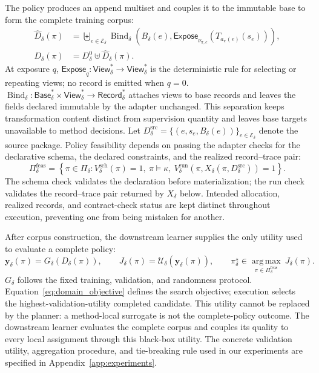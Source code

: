 The policy produces an append multiset and couples it to the immutable base to form the complete training corpus:
\begin{equation}
 \begin{aligned}
 \widehat D_{\delta}(\pi)
 &=\biguplus_{e\in\mathcal{E}_{\delta}}
 \operatorname{Bind}_{\delta}\!\left(
 B_{\delta}(e),
 \mathsf{Expose}_{\nu_{\pi,e}}\!
 \left(T_{a_{\pi}(e)}(s_e)\right)\right),\\
 D_{\delta}(\pi)
 &=D^0_{\delta}\mathbin{\uplus}\widehat D_{\delta}(\pi).
 \end{aligned}
 \label{eq:induced_corpus}
\end{equation}
At exposure $q$, $\mathsf{Expose}_{q}:\mathsf{View}_{\delta}^{*}\to\mathsf{View}_{\delta}^{*}$ is the deterministic rule for selecting or repeating views; no record is emitted when $q=0$.
$\operatorname{Bind}_{\delta}:\mathsf{Base}_{\delta}^{*}\times\mathsf{View}_{\delta}^{*}\to\mathsf{Record}_{\delta}^{*}$ attaches views to base records and leaves the fields declared immutable by the adapter unchanged.
This separation keeps transformation content distinct from supervision quantity and leaves base targets unavailable to method decisions.
Let $D_{\delta}^{\mathrm{src}}=\{(e,s_e,B_{\delta}(e))\}_{e\in\mathcal{E}_{\delta}}$ denote the source package.
Policy feasibility depends on passing the adapter checks for the declarative schema, the declared constraints, and the realized record--trace pair:
\begin{equation}
 \Pi_{\delta}^{\mathrm{feas}}
 =\left\{\pi\in\Pi_{\delta}:
 V_{\delta}^{\mathrm{sch}}(\pi)=1,\ 
 \pi\models\kappa,\ 
 V_{\delta}^{\mathrm{run}}\!\left(\pi,
 X_{\delta}(\pi,D_{\delta}^{\mathrm{src}})\right)=1\right\}.
 \label{eq:feasible_policy}
\end{equation}
The schema check validates the declaration before materialization; the run check validates the record--trace pair returned by $X_{\delta}$ below.
Intended allocation, realized records, and contract-check status are kept distinct throughout execution, preventing one from being mistaken for another.

After corpus construction, the downstream learner supplies the only utility used to evaluate a complete policy:
\begin{equation}
 \mathbf{y}_{\delta}(\pi)
 =G_{\delta}\!\left(D_{\delta}(\pi)\right),\qquad
 J_{\delta}(\pi)=\mathcal{U}_{\delta}\!\left(\mathbf{y}_{\delta}(\pi)\right),\qquad
 \pi_{\delta}^{\star}\in
 \underset{\pi\in\Pi_{\delta}^{\mathrm{feas}}}{\operatorname{arg\,max}}\ J_{\delta}(\pi).
 \label{eq:domain_objective}
\end{equation}
$G_{\delta}$ follows the fixed training, validation, and randomness protocol. Equation~\eqref{eq:domain_objective} defines the search objective; execution selects the highest-validation-utility completed candidate.
This utility cannot be replaced by the planner: a method-local surrogate is not the complete-policy outcome.
The downstream learner evaluates the complete corpus and couples its quality to every local assignment through this black-box utility.
The concrete validation utility, aggregation procedure, and tie-breaking rule used in our experiments are specified in Appendix~\ref{app:experiments}.


